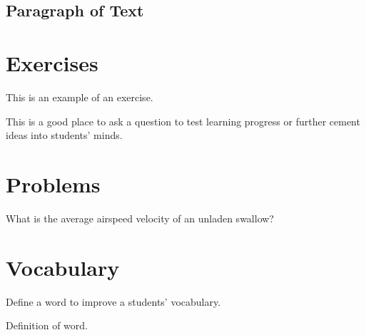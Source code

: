 \documentclass[12pt,fleqn,a4paper]{book} %
\begin{document}
    \subsection{Paragraph of Text}
    
    \begin{example}
    \lipsum[2]
    \end{example}
    
    
    \section{Exercises}
    
    This is an example of an exercise.
    
    \begin{exercise}
    This is a good place to ask a question to test learning progress or further cement ideas into students' minds.
    \end{exercise}
    
    
    \section{Problems}
    
    \begin{problem}
    What is the average airspeed velocity of an unladen swallow?
    \end{problem}
    
    
    \section{Vocabulary}
    
    Define a word to improve a students' vocabulary.
    
    \begin{vocabulary}[Word]
    Definition of word.
    \end{vocabulary}
    
    
\end{document}
